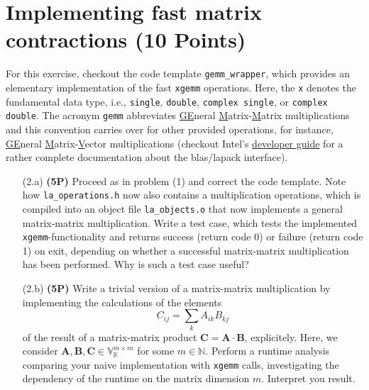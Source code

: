 \documentclass[a4paper, 12pt]{article}
\begin{document}
\section{Implementing fast matrix contractions \textbf{(10 Points)}}
%
For this exercise, checkout the code template \texttt{gemm\_wrapper}, which provides an elementary implementation of the fast \texttt{xgemm} operations.
%
Here, the \texttt{x} denotes the fundamental data type, i.e., \texttt{single}, \texttt{double}, \texttt{complex single}, or \texttt{complex double}.
%
The acronym \texttt{gemm} abbreviates \underline{GE}neral \underline{M}atrix-\underline{M}atrix multiplications and this convention carries over for other provided operations, for instance, \underline{GE}neral \underline{M}atrix-\underline{V}ector multiplications (checkout Intel's \href{https://www.intel.com/content/www/us/en/docs/onemkl/developer-guide-linux/2023-1/overview.html}{developer guide} for a rather complete documentation about the blas/lapack interface).
%
\begin{itemize}
	\item[(2.a)] \textbf{(5P)}
	Proceed as in problem (1) and correct the code template.
	Note how \texttt{la\_operations.h} now also contains a multiplication operations, which is compiled into an object file \texttt{la\_objects.o} that now implements a general matrix-matrix multiplication.
	Write a test case, which tests the implemented \texttt{xgemm}-functionality and returns success (return code 0) or failure (return code 1) on exit, depending on whether a successful matrix-matrix multiplication has been performed.
	Why is such a test case useful?
	\item[(2.b)] \textbf{(5P)}
	Write a trivial version of a matrix-matrix multiplication by implementing the calculations of the elements
	\begin{equation}
		C_{ij} = \sum_k A_{ik} B_{kj}
	\end{equation}
	of the result of a matrix-matrix product $\mathbf C = \mathbf A \cdot \mathbf B$, explicitely.
	Here, we consider $\mathbf A, \mathbf B, \mathbf C \in \mathbb V^{m\times m}_\mathbb{R}$ for some $m\in \mathbb N$.
	Perform a runtime analysis comparing your naive implementation with \texttt{xgemm} calls, investigating the dependency of the runtime on the matrix dimension $m$.
	Interpret you result.
\end{itemize}
%

%
\end{document}
